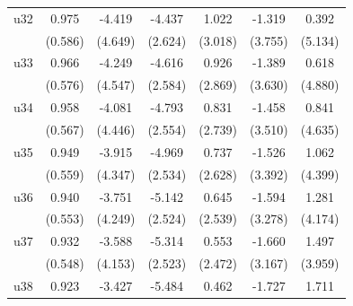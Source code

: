 \begin{table}[htbp]
\begin{tabular}{l*{6}{c}}
\addlinespace
u32                 &       0.975\sym{*}  &      -4.419         &      -4.437\sym{*}  &       1.022         &      -1.319         &       0.392         \\
                    &     (0.586)         &     (4.649)         &     (2.624)         &     (3.018)         &     (3.755)         &     (5.134)         \\
\addlinespace
u33                 &       0.966\sym{*}  &      -4.249         &      -4.616\sym{*}  &       0.926         &      -1.389         &       0.618         \\
                    &     (0.576)         &     (4.547)         &     (2.584)         &     (2.869)         &     (3.630)         &     (4.880)         \\
\addlinespace
u34                 &       0.958\sym{*}  &      -4.081         &      -4.793\sym{*}  &       0.831         &      -1.458         &       0.841         \\
                    &     (0.567)         &     (4.446)         &     (2.554)         &     (2.739)         &     (3.510)         &     (4.635)         \\
\addlinespace
u35                 &       0.949\sym{*}  &      -3.915         &      -4.969\sym{**} &       0.737         &      -1.526         &       1.062         \\
                    &     (0.559)         &     (4.347)         &     (2.534)         &     (2.628)         &     (3.392)         &     (4.399)         \\
\addlinespace
u36                 &       0.940\sym{*}  &      -3.751         &      -5.142\sym{**} &       0.645         &      -1.594         &       1.281         \\
                    &     (0.553)         &     (4.249)         &     (2.524)         &     (2.539)         &     (3.278)         &     (4.174)         \\
\addlinespace
u37                 &       0.932\sym{*}  &      -3.588         &      -5.314\sym{**} &       0.553         &      -1.660         &       1.497         \\
                    &     (0.548)         &     (4.153)         &     (2.523)         &     (2.472)         &     (3.167)         &     (3.959)         \\
\addlinespace
u38                 &       0.923\sym{*}  &      -3.427         &      -5.484\sym{**} &       0.462         &      -1.727         &       1.711         \\

\end{tabular}
\end{table}
